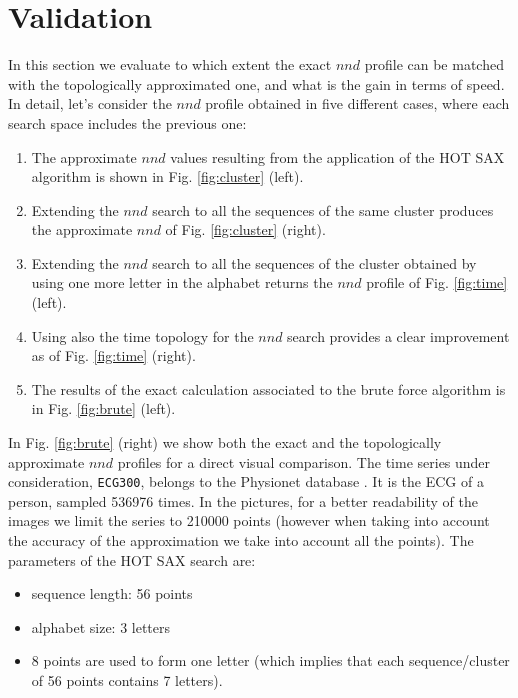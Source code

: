 \documentclass[a4paper,twoside]{article}
\begin{document}
\section{Validation}\label{sec:validation}
In this section we evaluate to which extent the exact $nnd$ profile can be matched with the topologically approximated one, and what is the gain in terms of speed.
%
% 
%
In detail, let's consider the $nnd$ profile obtained in five different cases, where each search space includes the previous one:
\begin{enumerate}
\item The approximate $nnd$ values resulting from the application of the HOT SAX algorithm is shown in Fig. \ref{fig:cluster}  (left). 
%
\item Extending the $nnd$ search to all the sequences of the same cluster produces the approximate $nnd$ of Fig. \ref{fig:cluster} (right).
%
\item Extending the $nnd$ search to all the sequences of the cluster obtained by using one more letter in the alphabet returns the $nnd$ profile of  Fig. \ref{fig:time} (left).

\item Using also the time topology for the $nnd$ search provides a clear improvement as of Fig. \ref{fig:time} (right).
\item The results of the exact calculation associated to the brute force algorithm is in Fig. \ref{fig:brute} (left).
\end {enumerate}
In Fig. \ref{fig:brute} (right) we show both the exact and the topologically approximate $nnd$ profiles for a direct visual comparison.
%
The time series under consideration, \verb|ECG300|, belongs to the Physionet database \cite{physio}. It is
the ECG of a person, sampled 536976 times. In the pictures, for a better readability of the images we limit the series to 210000 points (however when taking into account the accuracy of the approximation we take into account all the points). 
The parameters of the HOT SAX search are:
\begin{itemize}
 \item sequence length:  56 points 
 \item alphabet size: 3 letters
 \item 8 points are used to form one letter (which implies that each sequence/cluster of 56 points contains 7 letters).
\end{itemize}
\end{document}
